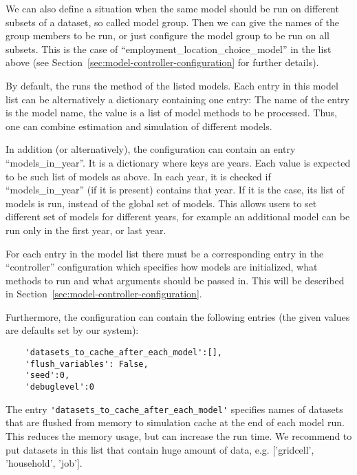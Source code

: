 We can also define a situation when the same model should be run on different subsets of 
a dataset, so called model group. Then we can give the names of the group members to be run, or 
just configure the model group to be run on all subsets. This is the case of ``employment_location_choice_model''
in the list above (see Section~\ref{sec:model-controller-configuration} for further details).
 
By default, the  runs the method
 of the listed models. Each entry in this model list can be
alternatively a dictionary containing one entry: The name of the entry is the model
name, the value is a list of model methods to be processed. Thus, one can combine
estimation and simulation of different models. 

In addition (or alternatively), the configuration can contain an entry
``models_in_year''. It is a dictionary where keys are years. Each value is
expected to be such list of models as above. In each year, it is checked if
``models_in_year'' (if it is present) contains that year. If it is the case,
its list of models is run, instead of the global set of models. This allows
users to set different set of models for different years, for example an
additional model can be run only in the first year, or last year.

For each entry in the model list there must be a corresponding entry in
the ``controller'' configuration which specifies how models are initialized,
what methods to run and what arguments should be passed in. This will be
described in Section~\ref{sec:model-controller-configuration}.

Furthermore, the configuration can contain the following entries (the given
values are defaults set by our system):
\begin{verbatim}
    'datasets_to_cache_after_each_model':[],
    'flush_variables': False,
    'seed':0,
    'debuglevel':0
\end{verbatim}

The entry \verb|'datasets_to_cache_after_each_model'| specifies names of datasets that
are flushed from memory to simulation cache at the end of each model
run.  This reduces the memory
usage, but can increase the run time. We recommend to put datasets in this list
that contain huge amount of data, e.g.  ['gridcell', 'household', 'job'].

